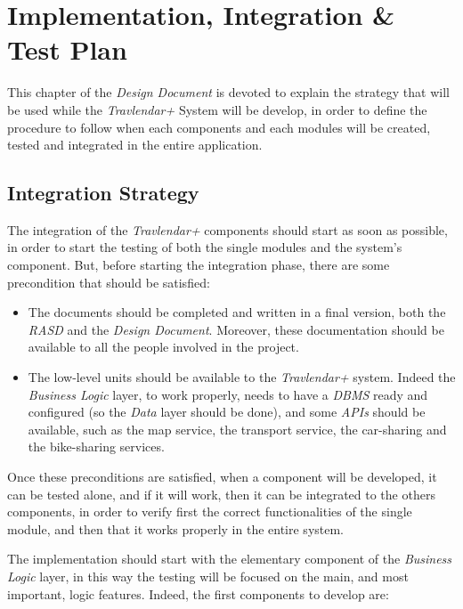 \chapter{Implementation, Integration \& Test Plan}

This chapter of the \emph{Design Document} is devoted to explain the strategy that will be used while the \emph{Travlendar+} System will be develop, in order to define the procedure to follow when each components and each modules will be created, tested and integrated in the entire application.

\section{Integration Strategy}
The integration of the \emph{Travlendar+} components should start as soon as possible, in order to start the testing of both the single modules and the system's component.
But, before starting the integration phase, there are some precondition that should be satisfied:

\begin{itemize}

    \item The documents should be completed and written in a final version, both the \emph{RASD} and the \emph{Design Document}. Moreover, these documentation should be available to all the people involved in the project.
    
    \item The low-level units should be available to the \emph{Travlendar+} system. Indeed the \emph{Business Logic} layer, to work properly, needs to have a \emph{DBMS} ready and configured (so the \emph{Data} layer should be done), and some \emph{APIs} should be available, such as the map service, the transport service, the car-sharing and the bike-sharing services.
    
\end{itemize}

Once these preconditions are satisfied, when a component will be developed, it can be tested alone, and if it will work, then it can be integrated to the others components, in order to verify first the correct functionalities of the single module, and then that it works properly in the entire system.

The implementation should start with the elementary component of the \emph{Business Logic} layer, in this way the testing will be focused on the main, and most important, logic features. Indeed, the first components to develop are:

